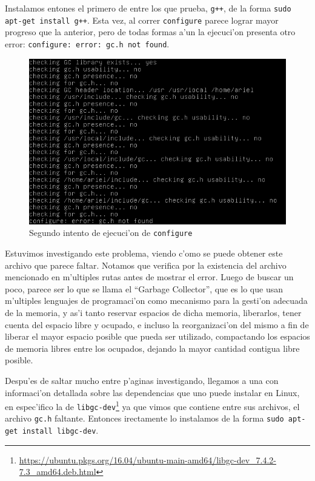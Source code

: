 \documentclass[11pt]{article}
\begin{document}
	Instalamos entones el primero de entre los que prueba, \texttt{g++}, de la forma \texttt{sudo apt-get install g++}. Esta vez, al correr \texttt{configure} parece lograr mayor progreso que la anterior, pero de todas formas a'un la ejecuci'on presenta otro error: \texttt{configure: error: gc.h not found}.
	
	\begin{figure}[H]
		\centering \captionsetup{justification=centering}
		\includegraphics[width=.8\linewidth]{Images/Compile_w3m/gc_missing}
		\caption{Segundo intento de ejecuci'on de \texttt{configure}}
	\end{figure}
	
	Estuvimos investigando este problema, viendo c'omo se puede obtener este archivo que parece faltar. Notamos que verifica por la existencia del archivo mencionado en m'ultiples rutas antes de mostrar el error. Luego de buscar un poco, parece ser lo que se llama el ``Garbage Collector'', que es lo que usan m'ultiples lenguajes de programaci'on como mecanismo para la gesti'on adecuada de la memoria, y as'i tanto reservar espacios de dicha memoria, liberarlos, tener cuenta del espacio libre y ocupado, e incluso la reorganizaci'on del mismo a fin de liberar el mayor espacio posible que pueda ser utilizado, compactando los espacios de memoria libres entre los ocupados, dejando la mayor cantidad contigua libre posible. 
	
	Despu'es de saltar mucho entre p'aginas investigando, llegamos a una con informaci'on detallada sobre las dependencias que uno puede instalar en Linux, en espec'ifico la de \texttt{libgc-dev}\footnote{\url{https://ubuntu.pkgs.org/16.04/ubuntu-main-amd64/libgc-dev_7.4.2-7.3_amd64.deb.html}} ya que vimos que contiene entre sus archivos, el archivo \texttt{gc.h} faltante. Entonces irectamente lo instalamos de la forma \texttt{sudo apt-get install libgc-dev}.
	
\end{document}
